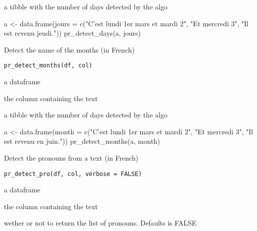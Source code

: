 \documentclass[a4paper]{book}
\begin{document}
%
\begin{Value}
a tibble with the number of days detected by the algo
\end{Value}
%
\begin{Examples}
\begin{ExampleCode}
a <- data.frame(jours = c("C'est lundi 1er mars et mardi 2", 
"Et mercredi 3", "Il est revenu jeudi."))
pr_detect_days(a, jours)
\end{ExampleCode}
\end{Examples}
%
\begin{Description}\relax
Detect the name of the months (in French)
\end{Description}
%
\begin{Usage}
\begin{verbatim}
pr_detect_months(df, col)
\end{verbatim}
\end{Usage}
%
\begin{Arguments}
\begin{ldescription}
\item[\code{df}] a dataframe

\item[\code{col}] the column containing the text
\end{ldescription}
\end{Arguments}
%
\begin{Value}
a tibble with the number of days detected by the algo
\end{Value}
%
\begin{Examples}
\begin{ExampleCode}
a <- data.frame(month = c("C'est lundi 1er mars et mardi 2", 
"Et mercredi 3", "Il est revenu en juin."))
pr_detect_months(a, month)
\end{ExampleCode}
\end{Examples}
%
\begin{Description}\relax
Detect the pronouns from a text (in French)
\end{Description}
%
\begin{Usage}
\begin{verbatim}
pr_detect_pro(df, col, verbose = FALSE)
\end{verbatim}
\end{Usage}
%
\begin{Arguments}
\begin{ldescription}
\item[\code{df}] a dataframe

\item[\code{col}] the column containing the text

\item[\code{verbose}] wether or not to return the list of pronouns. Defaults is FALSE
\end{ldescription}
\end{Arguments}
\end{document}
